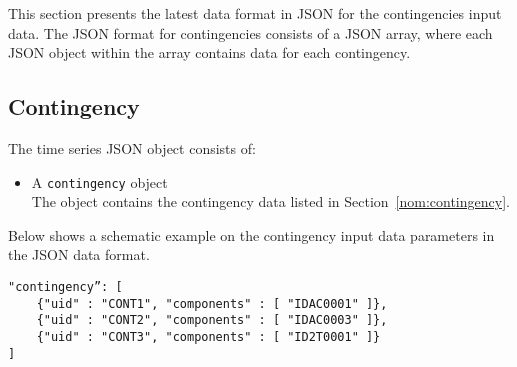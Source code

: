 \label{sec:contingency}
This section presents the latest data format in JSON for the contingencies input data.
The JSON format for contingencies consists of a JSON array,
where each JSON object within the array contains data for each contingency.

\subsection{Contingency}
\label{sec:input_data}
The time series JSON object consists of:
\begin{itemize}
    \item A \texttt{contingency} object\\
        The object contains the contingency data listed in Section~\ref{nom:contingency}.
\end{itemize}


Below shows a schematic example on the contingency input data parameters in the JSON data format.
\begin{verbatim}
"contingency”: [
    {"uid" : "CONT1", "components" : [ "IDAC0001" ]},
    {"uid" : "CONT2", "components" : [ "IDAC0003" ]},
    {"uid" : "CONT3", "components" : [ "ID2T0001" ]}
]
\end{verbatim}


